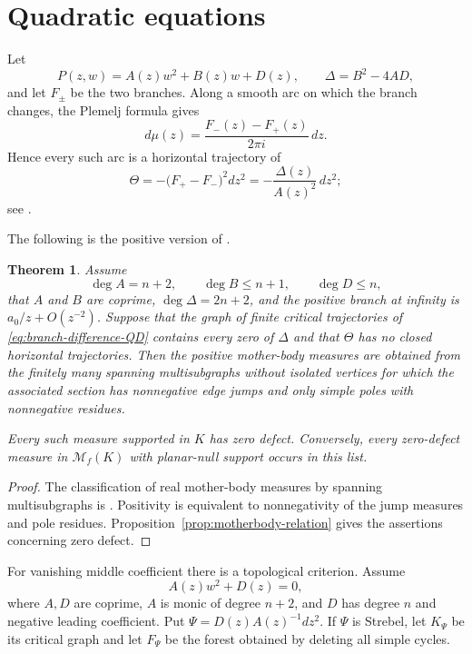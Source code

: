 \documentclass[reqno]{amsart}
\newtheorem{theorem}{Theorem}[section]
\theoremstyle{definition}
\theoremstyle{remark}
\newcommand{\M}{\mathcal M}
\begin{document}
\section{Quadratic equations}\label{sec:quadratic}

Let
\[
 P(z,w)=A(z)w^2+B(z)w+D(z),
 \qquad \Delta=B^2-4AD,
\]
and let $F_\pm$ be the two branches.  Along a smooth arc on which the branch
changes, the Plemelj formula gives
\[
 d\mu(z)=\frac{F_-(z)-F_+(z)}{2\pi i}\,dz.
\]
Hence every such arc is a horizontal trajectory of
\begin{equation}\label{eq:branch-difference-QD}
 \Theta=-\bigl(F_+-F_-\bigr)^2dz^2
       =-\frac{\Delta(z)}{A(z)^2}\,dz^2;
\end{equation}
see \cite[Proposition~9]{BoSh}.

The following is the positive version of \cite[Theorem~12]{BoSh}.

\begin{theorem}\label{thm:quadratic-finite}
Assume
\[
 \deg A=n+2,\qquad \deg B\le n+1,\qquad \deg D\le n,
\]
that $A$ and $B$ are coprime, $\deg\Delta=2n+2$, and the positive branch at
infinity is $a_0/z+O(z^{-2})$.  Suppose that the graph of finite critical
trajectories of \eqref{eq:branch-difference-QD} contains every zero of $\Delta$
and that $\Theta$ has no closed horizontal trajectories.  Then the positive
mother-body measures are obtained from the finitely many spanning
multisubgraphs without isolated vertices for which the associated section has
nonnegative edge jumps and only simple poles with nonnegative residues.

Every such measure supported in $K$ has zero defect.  Conversely, every
zero-defect measure in $\M_f(K)$ with planar-null support occurs in this list.
\end{theorem}

\begin{proof}
The classification of real mother-body measures by spanning multisubgraphs is
\cite[Theorem~12]{BoSh}.  Positivity is equivalent to nonnegativity of the jump
measures and pole residues.  Proposition~\ref{prop:motherbody-relation} gives
the assertions concerning zero defect.
\end{proof}

For vanishing middle coefficient there is a topological criterion.  Assume
\[
 A(z)w^2+D(z)=0,
\]
where $A,D$ are coprime, $A$ is monic of degree $n+2$, and $D$ has degree $n$
and negative leading coefficient.  Put
$\Psi=D(z)A(z)^{-1}dz^2$.  If $\Psi$ is Strebel, let $K_\Psi$ be its critical
graph and let $F_\Psi$ be the forest obtained by deleting all simple cycles.
\end{document}
